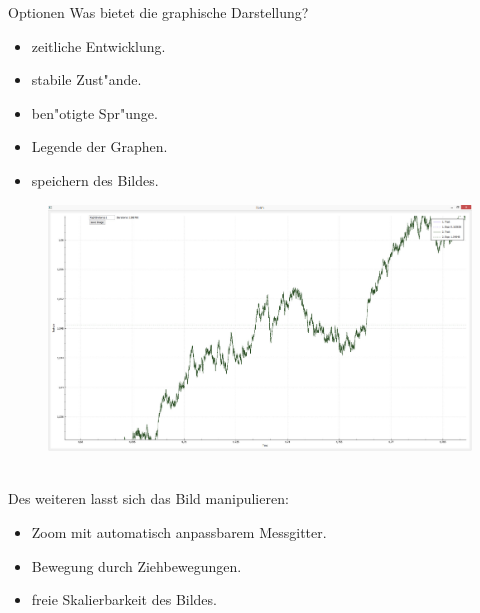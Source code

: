 \documentclass{beamer}
\begin{document}
\begin{frame}{Optionen}
	Was bietet die graphische Darstellung?\smallskip\\
	\begin{minipage}{0.42\textwidth}
	\begin{itemize}
		\item zeitliche Entwicklung.
		\item stabile Zust"ande.
		\item ben"otigte Spr"unge.
		\item Legende der Graphen.
		\item speichern des Bildes.
	\end{itemize}
	\end{minipage}
	\begin{minipage}{0.56\textwidth}
	\begin{figure}[H]
		\centering
		\includegraphics[width=0.9\linewidth]{./Pictures/PlotWindow_zoomedBPDLmaximized}
	\end{figure}
	\end{minipage}\smallskip\\
	Des weiteren lasst sich das Bild manipulieren:
	\begin{itemize}
		\item Zoom mit automatisch anpassbarem Messgitter.
		\item Bewegung durch Ziehbewegungen.
		\item freie Skalierbarkeit des Bildes.
	\end{itemize}
\end{frame}
\end{document}
